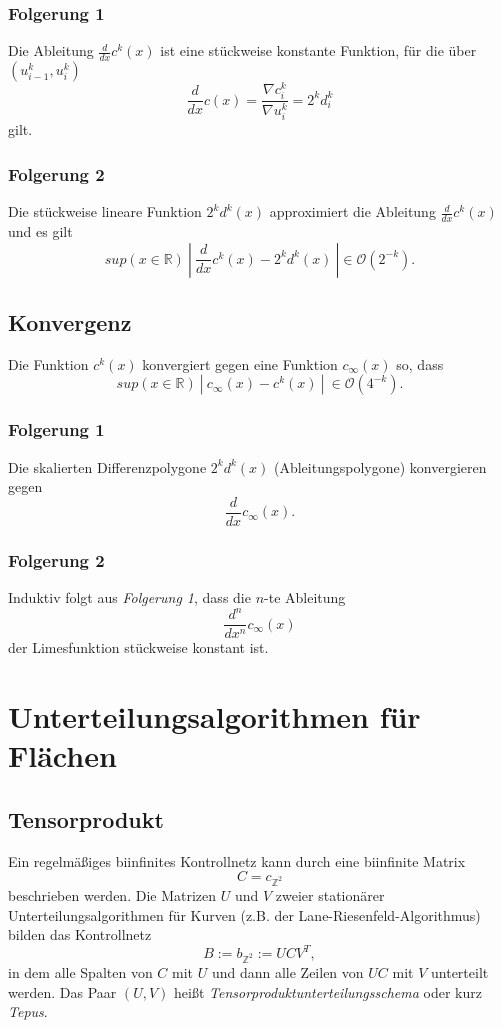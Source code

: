 \subsubsection{Folgerung 1}
Die Ableitung \(\frac{d}{dx}c^k(x)\) ist eine stückweise konstante Funktion, für die über \((u_{i-1}^k, u_i^k)\)
\[\frac{d}{dx}c(x) = \frac{\nabla c_i^k}{\nabla u_i^k} = 2^k d_i^k\]
gilt.

\subsubsection{Folgerung 2}
Die stückweise lineare Funktion \(2^k d^k(x)\) approximiert die Ableitung \(\frac{d}{dx} c^k(x)\) und es gilt
\[sup(x \in \mathbb{R})~|~\frac{d}{dx} c^k(x) - 2^k d^k(x)~| \in \mathcal{O}(2^{-k}).\]


\subsection{Konvergenz}
Die Funktion \(c^k(x)\) konvergiert gegen eine Funktion \(c_{\infty}(x)\) so, dass
\[sup(x \in \mathbb{R})~|~c_{\infty}(x) - c^k(x)~|~\in \mathcal{O}(4^{-k}).\]

\subsubsection{Folgerung 1}
Die skalierten Differenzpolygone \(2^k d^k(x)\) (Ableitungspolygone) konvergieren gegen
\[\frac{d}{dx} c_{\infty}(x).\]

\subsubsection{Folgerung 2}
Induktiv folgt aus \textit{Folgerung 1}, dass die \(n\)-te Ableitung
\[\frac{d^n}{dx^n} c_{\infty}(x)\]
der Limesfunktion stückweise konstant ist.



\section{Unterteilungsalgorithmen für Flächen}

\subsection{Tensorprodukt}
Ein regelmäßiges biinfinites Kontrollnetz kann durch eine biinfinite Matrix
\[C = c_{\mathbb{Z}^2}\]
beschrieben werden. Die Matrizen \(U\) und \(V\) zweier stationärer Unterteilungsalgorithmen für Kurven (z.B. der Lane-Riesenfeld-Algorithmus) bilden das Kontrollnetz
\[B := b_{\mathbb{Z}^2} := UCV^T,\]
in dem alle Spalten von \(C\) mit \(U\) und dann alle Zeilen von \(UC\) mit \(V\) unterteilt werden. Das Paar \((U,V)\) heißt \textit{Tensorproduktunterteilungsschema} oder kurz \textit{Tepus}.

